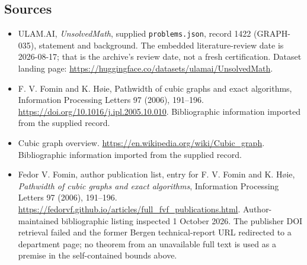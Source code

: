 \documentclass[11pt,a4paper]{article}
\begin{document}
\subsection{Sources}

{\small

\begin{itemize}

\item[\hypertarget{source:1422:1}{S1}] ULAM.AI, \emph{UnsolvedMath}, supplied \texttt{problems.json}, record 1422 (GRAPH-035), statement and background. The embedded literature-review date is 2026-08-17; that is the archive’s review date, not a fresh certification. Dataset landing page: \url{https://huggingface.co/datasets/ulamai/UnsolvedMath}.

\item[\hypertarget{source:1422:2}{S2}] F. V. Fomin and K. Høie, Pathwidth of cubic graphs and exact algorithms, Information Processing Letters 97 (2006), 191--196. \url{https://doi.org/10.1016/j.ipl.2005.10.010}. Bibliographic information imported from the supplied record.

\item[\hypertarget{source:1422:3}{S3}] Cubic graph overview. \url{https://en.wikipedia.org/wiki/Cubic_graph}. Bibliographic information imported from the supplied record.


\item[E1] Fedor V. Fomin, author publication list,
entry for F. V. Fomin and K. H\o ie, \emph{Pathwidth of cubic graphs
and exact algorithms}, Information Processing Letters 97 (2006),
191--196. \url{https://fedorvf.github.io/articles/full_fvf_publications.html}.
Author-maintained bibliographic listing inspected 1 October 2026.
The publisher DOI retrieval failed and the former Bergen technical-report
URL redirected to a department page; no theorem from an unavailable
full text is used as a premise in the self-contained bounds above.

\end{itemize}

}

\label{end:1422}
\end{document}
